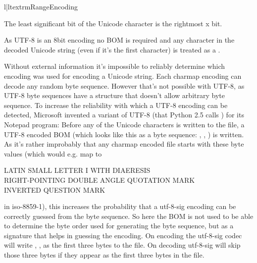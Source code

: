 \begin{tableii}{l|l}{textrm}{Range}{Encoding}
\end{tableii}

The least significant bit of the Unicode character is the rightmost x
bit.

As UTF-8 is an 8bit encoding no BOM is required and any 
character in the decoded Unicode string (even if it's the first
character) is treated as a .

Without external information it's impossible to reliably determine
which encoding was used for encoding a Unicode string. Each charmap
encoding can decode any random byte sequence. However that's not
possible with UTF-8, as UTF-8 byte sequences have a structure that
doesn't allow arbitrary byte sequence. To increase the reliability
with which a UTF-8 encoding can be detected, Microsoft invented a
variant of UTF-8 (that Python 2.5 calls ) for its Notepad
program: Before any of the Unicode characters is written to the file,
a UTF-8 encoded BOM (which looks like this as a byte sequence: ,
, ) is written. As it's rather improbably that any
charmap encoded file starts with these byte values (which would e.g. map to

   LATIN SMALL LETTER I WITH DIAERESIS \\
   RIGHT-POINTING DOUBLE ANGLE QUOTATION MARK \\
   INVERTED QUESTION MARK

in iso-8859-1), this increases the probability that a utf-8-sig
encoding can be correctly guessed from the byte sequence. So here the
BOM is not used to be able to determine the byte order used for
generating the byte sequence, but as a signature that helps in
guessing the encoding. On encoding the utf-8-sig codec will write
, ,  as the first three bytes to the file.
On decoding utf-8-sig will skip those three bytes if they appear as the
first three bytes in the file.


